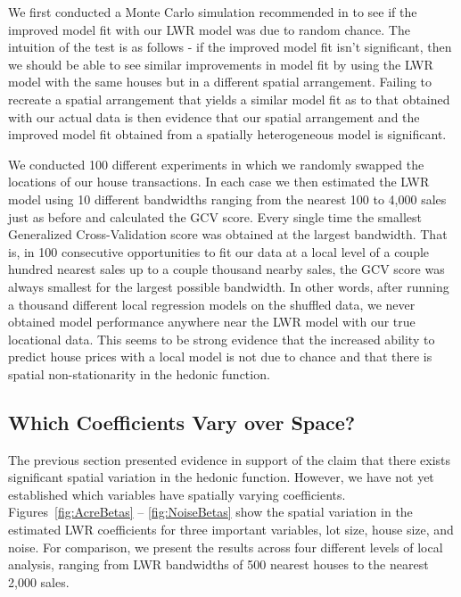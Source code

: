 \documentclass{article}\usepackage{graphicx, color}
\begin{document}
We first conducted a Monte Carlo simulation recommended in \citet{Fotheringham2002} to see if the improved model fit with our LWR model was due to random chance. The intuition of the test is as follows - if the improved model fit isn't significant, then we should be able to see similar improvements in model fit by using the LWR model with the same houses but in a different spatial arrangement. Failing to recreate a spatial arrangement that yields a similar model fit as to that obtained with our actual data is then evidence that our spatial arrangement and the improved model fit obtained from a spatially heterogeneous model is significant. 

We conducted 100 different experiments in which we randomly swapped the locations of our house transactions. In each case we then estimated the LWR model using 10 different bandwidths ranging from the nearest 100 to 4,000 sales just as before and calculated the GCV score. Every single time the smallest Generalized Cross-Validation score was obtained at the largest bandwidth. That is, in 100 consecutive opportunities to fit our data at a local level of a couple hundred nearest sales up to a couple thousand nearby sales, the GCV score was always smallest for the largest possible bandwidth. In other words, after running a thousand different local regression models on the shuffled data, we never obtained model performance anywhere near the LWR model with our true locational data. This seems to be strong evidence that the increased ability to predict house prices with a local model is not due to chance and that there is spatial non-stationarity in the hedonic function.



\subsection{Which Coefficients Vary over Space?}

The previous section presented evidence in support of the claim that there exists significant spatial variation in the hedonic function. However, we have not yet established which variables have spatially varying coefficients. Figures~\ref{fig:AcreBetas} -- \ref{fig:NoiseBetas} show the spatial variation in the estimated LWR coefficients for three important variables, lot size, house size, and noise. For comparison, we present the results across four different levels of local analysis, ranging from LWR bandwidths of 500 nearest houses to the nearest 2,000 sales. 
\end{document}
